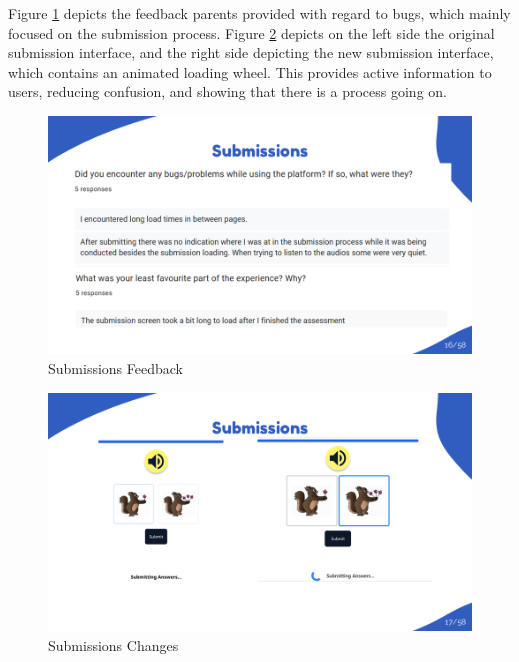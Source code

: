 \documentclass{article}
\begin{document}
\newpage

Figure \ref{fig:submissions_feedback} depicts the feedback parents provided with regard to bugs, which mainly focused on the submission process.
Figure \ref{fig:submissions_changes} depicts on the left side the original submission interface, and the right side depicting the new submission interface, which contains
an animated loading wheel. This provides active information to users, reducing confusion, and showing that there is a process going on. 

\begin{figure}[H]
  \centering
  \includegraphics[width=\textwidth]{images/slide16.png}
  \caption{Submissions Feedback}
  \label{fig:submissions_feedback}
\end{figure}

\begin{figure}[H]
  \centering
  \includegraphics[width=\textwidth]{images/slide17.png}
  \caption{Submissions Changes}
  \label{fig:submissions_changes}
\end{figure}

\newpage
\end{document}
